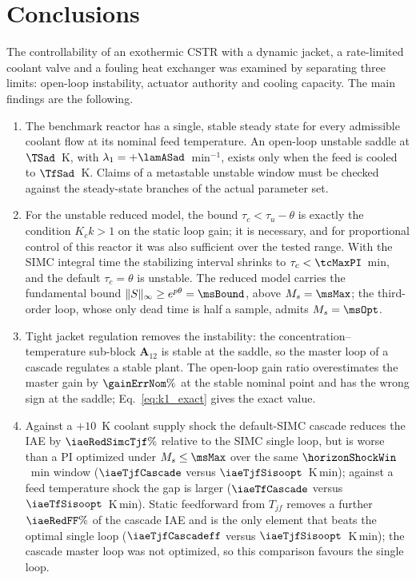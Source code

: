 \section{Conclusions}
\label{sec:conclusion}

The controllability of an exothermic CSTR with a dynamic jacket, a rate-limited coolant valve and a fouling heat exchanger was examined by separating three limits: open-loop instability, actuator authority and cooling capacity. The main findings are the following.
\begin{enumerate}
    \item The benchmark reactor has a single, stable steady state for every admissible coolant flow at its nominal feed temperature. An open-loop unstable saddle at $\TSad$~K, with $\lambda_1=+\lamASad$~min$^{-1}$, exists only when the feed is cooled to $\TfSad$~K. Claims of a metastable unstable window must be checked against the steady-state branches of the actual parameter set.
    \item For the unstable reduced model, the bound $\tau_c<\tau_u-\theta$ is exactly the condition $K_ck>1$ on the static loop gain; it is necessary, and for proportional control of this reactor it was also sufficient over the tested range. With the SIMC integral time the stabilizing interval shrinks to $\tau_c<\tcMaxPI$~min, and the default $\tau_c=\theta$ is unstable. The reduced model carries the fundamental bound $\|S\|_\infty\ge e^{p\theta}=\msBound$, above $M_s=\msMax$; the third-order loop, whose only dead time is half a sample, admits $M_s=\msOpt$.
    \item Tight jacket regulation removes the instability: the concentration--temperature sub-block $\mathbf{A}_{12}$ is stable at the saddle, so the master loop of a cascade regulates a stable plant. The open-loop gain ratio overestimates the master gain by $\gainErrNom\%$ at the stable nominal point and has the wrong sign at the saddle; Eq.~\eqref{eq:k1_exact} gives the exact value.
    \item Against a $+10$~K coolant supply shock the default-SIMC cascade reduces the IAE by $\iaeRedSimcTjf\%$ relative to the SIMC single loop, but is worse than a PI optimized under $M_s\le\msMax$ over the same $\horizonShockWin$~min window ($\iaeTjfCascade$ versus $\iaeTjfSisoopt$~K\,min); against a feed temperature shock the gap is larger ($\iaeTfCascade$ versus $\iaeTfSisoopt$~K\,min). Static feedforward from $T_{jf}$ removes a further $\iaeRedFF\%$ of the cascade IAE and is the only element that beats the optimal single loop ($\iaeTjfCascadeff$ versus $\iaeTjfSisoopt$~K\,min); the cascade master loop was not optimized, so this comparison favours the single loop.

\end{enumerate}
